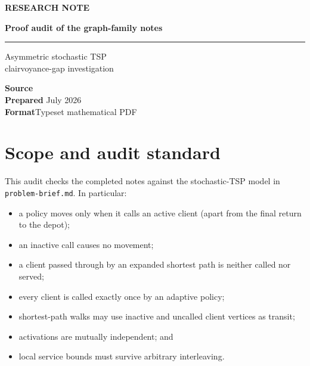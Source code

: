 \documentclass[11pt,a4paper]{article}
\newenvironment{ResearchContents}
  {\begin{tcolorbox}[breakable,colback=SoftBlue,colframe=SoftBlue,arc=2pt]}
  {\end{tcolorbox}}
\begin{document}
\color{BodyGray}
\begin{titlepage}
  \thispagestyle{empty}
  \vspace*{22mm}
  {\sffamily\small\bfseries\color{Accent}\MakeUppercase{Research note}}\par
  \vspace{8mm}
  {\sffamily\fontsize{21}{25}\selectfont\bfseries\color{Navy} Proof audit of the graph-family notes}\par
  \vspace{6mm}
  {\color{Accent}\rule{42mm}{1.4pt}}\par
  \vspace{11mm}
  {\Large\color{BodyGray} Asymmetric stochastic TSP\\
  clairvoyance-gap investigation}\par
  \vfill
  \begin{tcolorbox}[
    colback=SoftBlue,colframe=SoftBlue,arc=2pt,
    left=10pt,right=10pt,top=8pt,bottom=8pt]
    \sffamily
    \textbf{Source}\quad {}\\[3pt]
    \textbf{Prepared} July 2026\\[3pt]
    \textbf{Format}\quad Typeset mathematical PDF
  \end{tcolorbox}
  \vspace{12mm}
\end{titlepage}

\begin{ResearchContents}
\tableofcontents
\end{ResearchContents}
\clearpage

\section*{Scope and audit standard}

This audit checks the completed notes against the stochastic-TSP model in \nolinkurl{problem-brief.md}.  In particular:


\begin{itemize}

\item a policy moves only when it calls an active client (apart from the final return to the depot);

\item an inactive call causes no movement;

\item a client passed through by an expanded shortest path is neither called nor served;

\item every client is called exactly once by an adaptive policy;

\item shortest-path walks may use inactive and uncalled client vertices as transit;

\item activations are mutually independent; and

\item local service bounds must survive arbitrary interleaving.

\end{itemize}
\end{document}
